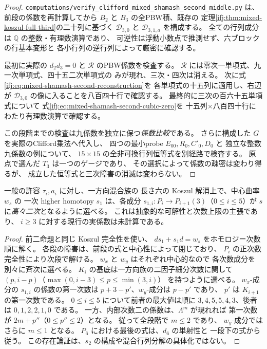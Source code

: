 \begin{proof}
\texttt{computations/verify\_clifford\_mixed\_shamash\_second\_middle.py}
は、前段の係数を再計算してから
$B_2$ と $B_3$ の全PBW積、既存の
定理\ref{ifj:thm:mixed-koszul-full-third}の二十列に基づく
$\mathcal D_{3,0}$ と $\mathcal D_{3,1,a}$ を構成する。
全ての行列成分は $\mathbb Q$ の整数・有理数演算であり、
可逆性は浮動小数点で推測せず、六ブロックの行基本変形と
各小行列の逆行列によって厳密に確認する。

最初に実際の $d_2d_3=0$ と
$\mathcal R$ のPBW係数を検査する。
$\mathcal R$ には零次一単項式、九一次単項式、四十五二次単項式の
みが現れ、三次・四次は消える。
次に式\eqref{ifj:eq:mixed-shamash-second-reconstruction}を
各単項式の十五列に適用し、右辺が
$\mathcal D_{3,0}$ の像に入ることを八百四十行で確認する。
最終的に三次の百六十五単項式について
式\eqref{ifj:eq:mixed-shamash-second-cubic-zero}を
十五列×八百四十行にわたり有理数演算で確認する。

この段階までの検査は九係数を独立に保つ\emph{係数比較}である。
さらに構成した $G$ を実際のClifford乗法へ代入し、
四つの最小probe $E_{00},R_0,C'_0,D_0$ と
独立な整数九係数の例について、
$15\times15$ の全非可換行列恒等式を別経路で検査する。
原点で選んだ $T_3$ は一つのゲージであり、
その選択によって係数の疎密は変わり得るが、
成立した恒等式と三次障害の消滅は変わらない。
\end{proof}

\begin{corollary}
\label{ifj:cor:mixed-shamash-entire-first-degree-bound}
一般の許容 $\tau_i,a_i$ に対し、一方向混合族の
長さ六の Koszul 解消上で、中心曲率 $w_s$ の
一次 higher homotopy $s_1$ は、各成分
$s_{1,i}:P_i\to P_{i+1}(3)$（$0\le i\le5$）が
$s$ に\emph{高々二次}となるように選べる。
これは抽象的な可解性と次数上限の主張であり、
$i\ge3$ に対する現行の実係数は未計算である。
\end{corollary}

\begin{proof}
前二命題と同じ Koszul 完全性を使い、
$ds_1+s_1d=w_s$ をホモロジー次数順に解く。
各段の障害は、前段の式と中心性によって閉じており、
$P_i$ の正次数完全性により次段で解ける。
$w_x$ と $w_y$ はそれぞれ中心的なので
各次数成分を別々に斉次に選べる。
$K_i$ の基底は一方向族の二因子細分次数に関して
$(p,i-p)$（$\max(0,i-3)\le p\le\min(3,i)$）
を持つように選べる。
$w_x$-成分の $s_{1,i}$ の係数の第一次数は
$p+3-p'$、$w_y$-成分は $p-p'$ であり、
$p'$ は $K_{i+1}$ の第一次数である。
$0\le i\le5$ について前者の最大値は順に
$3,4,5,5,4,3$、後者は
$0,1,2,2,1,0$ である。
一方、内部次数二の係数は、$\Lambda^m$ が現れれば
第一次数が $2m+p''$（$0\le p''\le2$）となる。
従って全段階で $m\le2$ であり、
$w_y$-成分ではさらに $m\le1$ となる。
$P_6$ における最後の式は、$d_6$ の単射性と
一段下の式から従う。
この存在論証は、$s_2$ の構成や混合行列分解の具体化ではない。
\end{proof}

